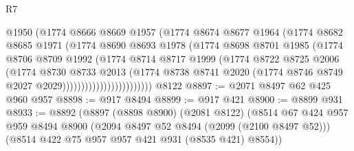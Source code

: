 \begin{lexlean}{R7}
\begin{coremodule}
                              @1950
                              (@1774
                                @8666
                                @8669
                                @1957
                                (@1774
                                  @8674
                                  @8677
                                  @1964
                                  (@1774
                                    @8682
                                    @8685
                                    @1971
                                    (@1774
                                      @8690
                                      @8693
                                      @1978
                                      (@1774
                                        @8698
                                        @8701
                                        @1985
                                        (@1774
                                          @8706
                                          @8709
                                          @1992
                                          (@1774
                                            @8714
                                            @8717
                                            @1999
                                            (@1774
                                              @8722
                                              @8725
                                              @2006
                                              (@1774
                                                @8730
                                                @8733
                                                @2013
                                                (@1774
                                                  @8738
                                                  @8741
                                                  @2020
                                                  (@1774
                                                    @8746
                                                    @8749
                                                    @2027
                                                    @2029))))))))))))))))))))))))
    @8122
@8897 := @2071 @8497 @62 @425 @960 @957
@8898 := @917 @8494
@8899 := @917 @421
@8900 := @8899 @931
@8933 := @8892
    (@8897
      (@8898 @8900)
      (@2081 @8122)
      (@8514
        @67
        @424
        @957
        @959
        @8494
        @8900
        (@2094 @8497 @52 @8494 (@2099 (@2100 @8497 @52)))
        (@8514 @422 @75 @957 @957 @421 @931 (@8535 @421) @8554))

\end{coremodule}
\end{lexlean}
